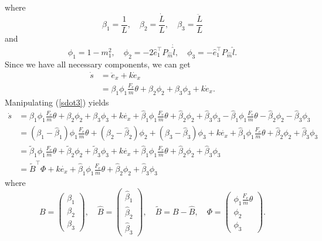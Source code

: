where
\begin{equation}
\beta_1=\frac{1}{L},\quad \beta_2=\frac{\dot{L}}{L}, \quad \beta_3=\frac{\ddot{L}}{L}
\end{equation}
and
\begin{equation}
\phi_1=1-m_1^2,\quad \phi_2=-2\hat{e}_1^{\top}P_{\hat{m}}\dot{\hat{l}}, \quad \phi_3=-\hat{e}_1^{\top}P_{\hat{m}}\hat{l}.
\end{equation}
Since we have all necessary components, we can get 
\begin{align}
\dot{s}&=\ddot{e}_x+k\dot{e}_x
\\&=\beta_1\phi_1\frac{F_e}{m}\theta+\beta_2\phi_2+\beta_3\phi_3+k\dot{e}_x.
\label{sdot3}
\end{align}
Manipulating (\ref{sdot3}) yields
\begin{align}
\dot{s}&=\beta_1\phi_1\frac{F_e}{m}\theta+\beta_2\phi_2+\beta_3\phi_3+k\dot{e_x}+\hat{\beta}_1\phi_1\frac{F_e}{m}\theta+\hat{\beta}_2\phi_2+\hat{\beta}_3\phi_3-\hat{\beta}_1\phi_1\frac{F_e}{m}\theta-\hat{\beta}_2\phi_2-\hat{\beta}_3\phi_3
\\&=(\beta_1-\hat{\beta}_1)\phi_1\frac{F_e}{m}\theta+(\beta_2-\hat{\beta}_2)\phi_2+(\beta_3-\hat{\beta}_3)\phi_3+k\dot{e_x}+\hat{\beta}_1\phi_1\frac{F_e}{m}\theta+\hat{\beta}_2\phi_2+\hat{\beta}_3\phi_3
\\&=\tilde{\beta}_1\phi_1\frac{F_e}{m}\theta+\tilde{\beta}_2\phi_2+\tilde{\beta}_3\phi_3+k\dot{e_x}+\hat{\beta}_1\phi_1\frac{F_e}{m}\theta+\hat{\beta}_2\phi_2+\hat{\beta}_3\phi_3
\\&=\tilde{B}^\top\Phi+k\dot{e_x}+\hat{\beta}_1\phi_1\frac{F_e}{m}\theta+\hat{\beta}_2\phi_2+\hat{\beta}_3\phi_3
\end{align}
where 
\begin{equation}
B=\begin{pmatrix}
\beta_1 \\ \beta_2 \\ \beta_3
\end{pmatrix}, \quad
\hat{B}=\begin{pmatrix} \hat{\beta}_1 \\ \hat{\beta}_2 \\ \hat{\beta}_3 \end{pmatrix}, \quad
\tilde{B}=B-\hat{B}, \quad 
\Phi=\begin{pmatrix} \phi_1\frac{F_e}{m}\theta \\ \phi_2 \\ \phi_3 \end{pmatrix}.
\end{equation}

